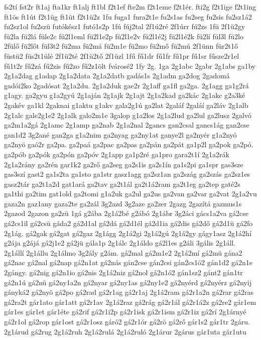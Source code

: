 {fs2tí
fst2r
ft1aj
fta1kr
ft1alj
ft1bl
f2t1ef
fte2m
f2t1eme
f2t1ér.
fti2g
f2t1ige
f2t1ing
ft1ös
ft1út
f2t1üg
ft1üt
f2t1ü2z
1fu
fuga1
fura2t1e
fu2s1as
fu2seg
fu2sis
fu2sz1á2
fu2sz1ol
fu2szü
futókész1
futó1s2p
1fú
fúj2tal
2f1ú2ré
2f1úrr
fú2zs
1fü
2f1ü2gy
fü2la
fü2lá
füle2c
fü2l1eml
fü2l1e2p
fü2l1e2v
fü2l1é2j
fü2l1é2k
fü2lí
fül3l
fü2lo
2fülő
fü2lőt
fül3t2
fü2ma
fü2má
fü2m1e
fü2mo
fü2mő
fü2mú
2f1ünn
für2t1ő
füstü2
füs2t1ülé
2f1ü2té
2f1ü2tő
2f1üzl
1fű
fű1dr
fű1fr
fű1pr
fű1sr
fűsze2r1el
fű1t2r
fű2zá
fű2zis
fű2zo
fű2z1ölt
fvárosé2
1fy
2g.
1ga
2g1abc
2gabr
2g1abs
ga1by
2g1a2dag
g1adap
2g1a2data
2g1a2datb
gadás1s
2g1adm
ga2dog
2gadomá
gadói2ko
2gadósat
2g1a2du.
2g1a2duk
gae2r
2g1aff
ga1fl
ga2ga.
2g1agg
ga1g2rá
g1agy.
ga2gyu
g1a2gyú
2g1aján
2g1ajk
2g1ajt
2g1a2kad
ga2kác
2g1akc
g2a3ké
2gakév
ga1kl
2gaknai
g1aktu
g1akv
gala2g1ú
ga2lat
2galáf
2galáí
ga2láv
2g1alb
2g1alc
gale2g1e2
2g1alk
galo2m1e
3galop
g1a2los
2g1a2lud
ga2lul
ga2lusz
2galvó
ga2m1a2gá
2g1amc
2g1amp
ga2nab
2g1a2nal
2gancs
gan2csal
gancs1ág
gan2cse
gan1d2
3g2ané
gan2ga
g1a2nim
ga2nyag
ga2ny1at
ganye2l
ga2nyér
g1a2nyó
ga2nyö
gaó2r
ga2pa.
ga2paá
ga2pac
ga2pas
ga2pán
ga2pát
ga1p2l
ga2pok
ga2pó.
ga2pób
ga2pók
ga2pón
ga2póv
2g1app
ga1p2ré
ga1pro
gara2t1í
2g1a2rák
2g1a2rány
ga2rén
gar1k2
ga2rő
ga2seg
ga2s1is
ga2s1ín
ga1s2pi
ga1spr
gas3sze
gas3szí
gast2
ga1s2ta
ga1sto
ga1str
gasz1agg
ga2sz1an
ga2szág
ga2szás
ga2sz1es
gasz2tár
ga2t1a2d
gat1ará
ga2tav
ga2t1ál
ga2t1á2ram
ga2t1eg
ga2tep
gaté2s
ga1thi
ga2tim
gat1old
ga2tomi
g1a2uk
ga2ul
ga2us
ga2van
ga2var
ga2vat
2g1a2vu
gaza2n
gaz1any
gaza2te
ga2zál
3g2azd
3g2aze
ga2zer
2gazg
2gazítá
gazmus1s
2gazod
2gazon
ga2zü
1gá
g2ába
2g1á2bé
g2ábó
2g1ábr
3g2áci
gács1a2va
gá2cse
gá2cs1il
gá2csü
gáda2
gá2d1al
gá2dá
gá2d1él
gá2d1ia
gá2dis
gá2dő
gá2d1ü
gá2fo
2g1ág.
gá2gak
gá2gat
gá2gaz
2g1ágg
2g1á2gi
2g1á2gú
2g1á2gy
gágy1asz
2g1á2hí
g2ája
g2ájá
gá2j1e2
gá2jü
gála1p
2g1álc
2g1áldo
gá2l1es
g2áli
3gális
2g1áll.
2g1állí
2g1állu
2g1álmo
3g2ály
g2ám.
gá2mal
gá2m1e2
2g1á2mí
gá2mü
gána2
gá2nac
gá2nal
gá2nap
gá2n1at
gá2nás
gán2cse
gán2csi
gán2cs1ö2
gán1d2
gá2n1e
2gángy.
gá2nig
gá2n1io
gá2nis
2g1á2niz
gá2nol
gá2n1ó2
gán1sz2
gánt2
gán1tr
gá2n1ú
gá2nü
gá2ny1a2n
gá2nyar
gá2ny1as
gá2ny1e2
gá2nyérd
gá2nyérz
gá2nyij
gányká2
gá2nyö
gá2po
gá2rad
gá2r1ag
gá2r1aj
2g1á2ram
gá2r1a2n
gá2rar
gá2ras
gá2ra2t
gár1ato
gár1att
gá2r1av
2g1á2raz
gá2rág
gá2r1ál
gá2r1á2z
gá2re2
gár1em
gár1es
gár1et
gár1éte
gá2rif
gá2r1i2p
gá2r1isk
gá2r1ism
gá2r1iz
gá2rí
2g1árnyé
gá2r1ol
gá2rop
gár1ost
gá2r1osz
gáró2
gá2r1ór
gá2rö
gá2rő
gár1s2
gár1tr
2gáru.
2g1árud
gá2rug
2g1á2ruh
2g1á2rulá
2g1á2ruló
2g1árur
2gárus
gár1uta
gár1utu
}
